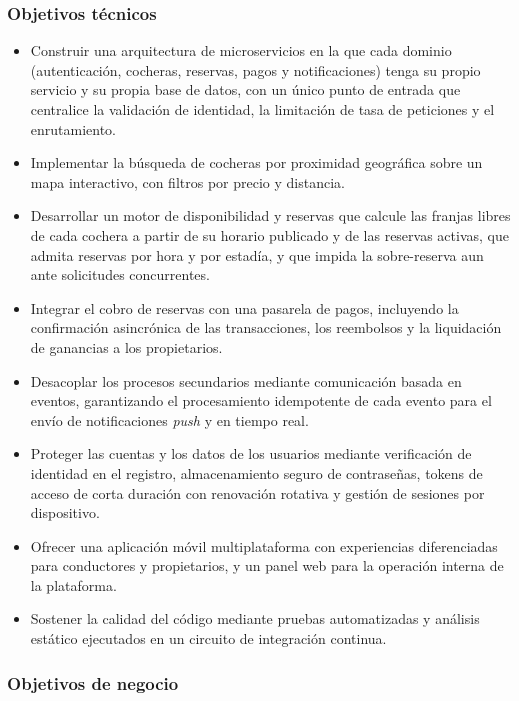 \subsubsection{Objetivos técnicos}

\begin{itemize}
    \item Construir una arquitectura de microservicios en la que cada dominio (autenticación, cocheras, reservas, pagos y notificaciones) tenga su propio servicio y su propia base de datos, con un único punto de entrada que centralice la validación de identidad, la limitación de tasa de peticiones y el enrutamiento.
    \item Implementar la búsqueda de cocheras por proximidad geográfica sobre un mapa interactivo, con filtros por precio y distancia.
    \item Desarrollar un motor de disponibilidad y reservas que calcule las franjas libres de cada cochera a partir de su horario publicado y de las reservas activas, que admita reservas por hora y por estadía, y que impida la sobre-reserva aun ante solicitudes concurrentes.
    \item Integrar el cobro de reservas con una pasarela de pagos, incluyendo la confirmación asincrónica de las transacciones, los reembolsos y la liquidación de ganancias a los propietarios.
    \item Desacoplar los procesos secundarios mediante comunicación basada en eventos, garantizando el procesamiento idempotente de cada evento para el envío de notificaciones \textit{push} y en tiempo real.
    \item Proteger las cuentas y los datos de los usuarios mediante verificación de identidad en el registro, almacenamiento seguro de contraseñas, tokens de acceso de corta duración con renovación rotativa y gestión de sesiones por dispositivo.
    \item Ofrecer una aplicación móvil multiplataforma con experiencias diferenciadas para conductores y propietarios, y un panel web para la operación interna de la plataforma.
    \item Sostener la calidad del código mediante pruebas automatizadas y análisis estático ejecutados en un circuito de integración continua.
\end{itemize}

\subsubsection{Objetivos de negocio}

